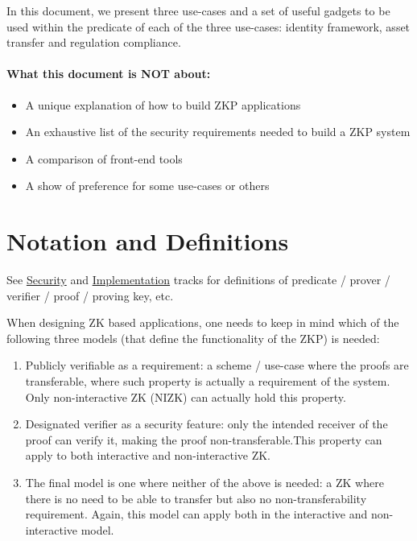 In this document, we present three use-cases and a set of useful gadgets to be used within the predicate of each of the three use-cases: identity framework, asset transfer and regulation compliance.


\paragraph{What this document is NOT about:}
\begin{itemize}
 \item A unique explanation of how to build ZKP applications
 \item An exhaustive list of the security requirements needed to build a ZKP system
 \item A comparison of front-end tools
 \item A show of preference for some use-cases or others
\end{itemize}

\section{Notation and Definitions}
\label{apps:notation-defs}

See \hyperref[chap:track-security]{Security} and \hyperref[chap:track-implem]{Implementation} tracks for definitions of predicate / prover / verifier / proof / proving key, etc.

When designing ZK based applications, one needs to keep in mind which of the following three models (that define the functionality of the ZKP) is needed:
\begin{enumerate}
    \item Publicly verifiable as a requirement: a scheme / use-case where the proofs are transferable, where such property is actually a requirement of the system. Only non-interactive ZK (NIZK) can actually hold this property.
    \item Designated verifier as a security feature: only the intended receiver of the proof can verify it, making the proof non-transferable.This property can apply to both interactive and non-interactive ZK.
    \item The final model is one where neither of the above is needed: a ZK where there is no need to be able to transfer but also no non-transferability requirement. Again, this model can apply both in the interactive and non-interactive model.
\end{enumerate}

